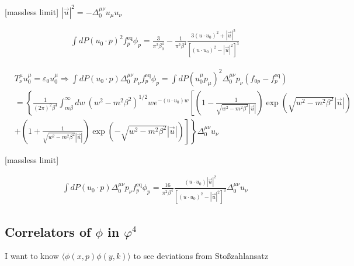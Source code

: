 \documentclass[aps,prd,preprint,nofootinbib,amsmath,amssymb,showpacs,longbibliography,singlecolumn,superscriptaddress,10pt]{revtex4-1}
\theoremstyle{plain}
\theoremstyle{definition}
\begin{document}
[massless limit] $|\Vec{u}|^{2} = - \Delta^{\mu \nu}_{0} u_{\mu} u_{\nu} $

\begin{equation}
\begin{aligned}
&
\int dP (u_{0} \cdot p )^{2} f^{\mathrm{eq}}_{p} \phi_{p} = \frac{3}{\pi^{2} \beta^{4}_{0}}
-
\frac{1}{\pi^{2} \beta^{4}} \frac{3 (u \cdot u_{0})^{2} + |\Vec{u}|^{2} }{[(u \cdot u_{0})^{2} - |\Vec{u}|^{2}]^{3}}
\end{aligned}    
\end{equation}

\begin{equation}
\begin{aligned}
&
T^{\mu}_{\nu}u_{0}^{\mu} = \varepsilon_{0} u^{\mu}_{0} 
\Rightarrow 
\int dP (u_{0} \cdot p) \Delta^{\mu \nu}_{0} p_{\nu} f^{\mathrm{eq}}_{p} \phi_{p}
=
\int dP (u^{\mu}_{0} p_{\mu})^{2} \Delta^{\mu \nu}_{0} p_{\nu} (f_{0p} - f^{\mathrm{eq}}_{p})
\\
&
=
\left\{ \frac{1}{(2 \pi)^{2} \beta^{4}}
\int_{m \beta}^{\infty} dw \ (w^{2} - m^{2} \beta^{2})^{1/2} w e^{- (u \cdot u_{0}) w}
\left[ \left( 1 - \frac{1}{\sqrt{w^{2} - m^{2} \beta^{2}} |\Vec{u}|} \right) \exp{\left( \sqrt{w^{2} - m^{2} \beta^{2}} |\Vec{u}| \right)}
\right. \right.
\\
&
\left. \left.
+
\left( 1 + \frac{1}{\sqrt{w^{2} - m^{2} \beta^{2}} |\Vec{u}|}  \right)
\exp{\left( -\sqrt{w^{2} - m^{2} \beta^{2}} |\Vec{u}| \right)} 
\right]
 \right\} \Delta^{\mu \nu}_{0} u_{\nu}
\end{aligned}    
\end{equation}

[massless limit]

\begin{equation}
\begin{aligned}
&
\int dP (u_{0} \cdot p) \Delta^{\mu \nu}_{0} p_{\nu} f^{\mathrm{eq}}_{p} \phi_{p}
=
\frac{16}{\pi^{2} \beta^{4}} \frac{ (u \cdot u_{0}) |\Vec{u}|^{2} }{[(u \cdot u_{0})^{2} - |\Vec{u}|^{2}]^{3}}
 \Delta^{\mu \nu}_{0} u_{\nu}
\end{aligned}    
\end{equation}

\subsection{Correlators of $\phi$ in $\varphi^{4}$}


I want to know $\langle \phi(x,p) \phi(y,k) \rangle$ to see deviations from Sto\ss zahlansatz
\end{document}
